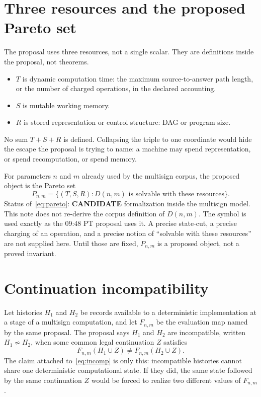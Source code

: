 \documentclass[11pt]{article}
\begin{document}
\section{Three resources and the proposed Pareto set}
The proposal uses three resources, not a single scalar.
They are definitions inside the proposal, not theorems.
\begin{itemize}
\item \(T\) is dynamic computation time: the maximum source-to-answer path length, or the number of charged operations, in the declared accounting.
\item \(S\) is mutable working memory.
\item \(R\) is stored representation or control structure: DAG or program size.
\end{itemize}
No sum \(T+S+R\) is defined.
Collapsing the triple to one coordinate would hide the escape the proposal is trying to name: a machine may spend representation, or spend recomputation, or spend memory.

For parameters \(n\) and \(m\) already used by the multisign corpus, the proposed object is the Pareto set
\begin{equation}
P_{n,m}
=
\bigl\{(T,S,R) : D(n,m)\text{ is solvable with these resources}\bigr\}.
\label{eq:pareto}
\end{equation}
Status of~\eqref{eq:pareto}: \textbf{CANDIDATE} formalization inside the multisign model.
This note does not re-derive the corpus definition of \(D(n,m)\).
The symbol is used exactly as the 09:48 PT proposal uses it.
A precise state-cut, a precise charging of an operation, and a precise notion of ``solvable with these resources'' are not supplied here.
Until those are fixed, \(P_{n,m}\) is a proposed object, not a proved invariant.

\section{Continuation incompatibility}
Let histories \(H_1\) and \(H_2\) be records available to a deterministic implementation at a stage of a multisign computation, and let \(F_{n,m}\) be the evaluation map named by the same proposal.
The proposal says \(H_1\) and \(H_2\) are incompatible, written \(H_1\not\sim H_2\), when some common legal continuation \(Z\) satisfies
\begin{equation}
F_{n,m}(H_1\cup Z)\neq F_{n,m}(H_2\cup Z).
\label{eq:incomp}
\end{equation}
The claim attached to~\eqref{eq:incomp} is only this: incompatible histories cannot share one deterministic computational state.
If they did, the same state followed by the same continuation \(Z\) would be forced to realize two different values of \(F_{n,m}\).
\end{document}
